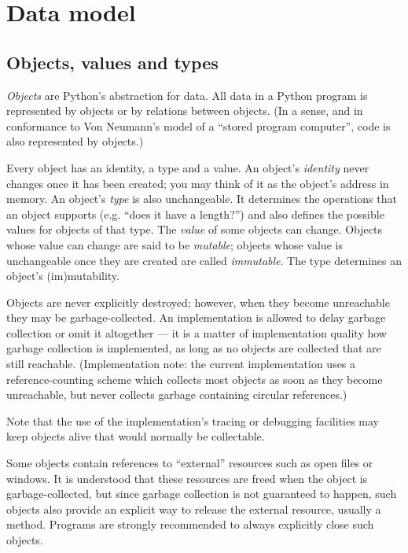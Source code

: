 \chapter{Data model}

\section{Objects, values and types}

{\em Objects} are Python's abstraction for data.  All data in a Python
program is represented by objects or by relations between objects.
(In a sense, and in conformance to Von Neumann's model of a
``stored program computer'', code is also represented by objects.)

Every object has an identity, a type and a value.  An object's {\em
identity} never changes once it has been created; you may think of it
as the object's address in memory.  An object's {\em type} is also
unchangeable.  It determines the operations that an object supports
(e.g. ``does it have a length?'') and also defines the possible
values for objects of that type.  The {\em value} of some objects can
change.  Objects whose value can change are said to be {\em mutable};
objects whose value is unchangeable once they are created are called
{\em immutable}.  The type determines an object's (im)mutability.

Objects are never explicitly destroyed; however, when they become
unreachable they may be garbage-collected.  An implementation is
allowed to delay garbage collection or omit it altogether --- it is a
matter of implementation quality how garbage collection is
implemented, as long as no objects are collected that are still
reachable.  (Implementation note: the current implementation uses a
reference-counting scheme which collects most objects as soon as they
become unreachable, but never collects garbage containing circular
references.)

Note that the use of the implementation's tracing or debugging
facilities may keep objects alive that would normally be collectable.

Some objects contain references to ``external'' resources such as open
files or windows.  It is understood that these resources are freed
when the object is garbage-collected, but since garbage collection is
not guaranteed to happen, such objects also provide an explicit way to
release the external resource, usually a \verb@close@ method.
Programs are strongly recommended to always explicitly close such
objects.

